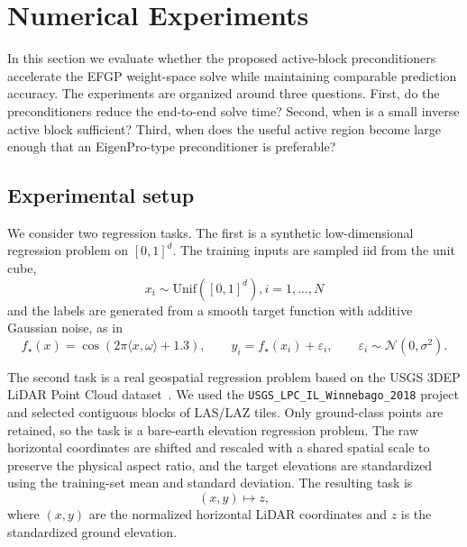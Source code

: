 
\section{Numerical Experiments}
\label{sec:experiments}

In this section we evaluate whether the proposed active-block preconditioners accelerate the EFGP weight-space solve while maintaining comparable prediction accuracy. The experiments are organized around three questions. First, do the preconditioners reduce the end-to-end solve time? Second, when is a small inverse active block sufficient? Third, when does the useful active region become large enough that an EigenPro-type preconditioner is preferable?

\subsection{Experimental setup}
\label{subsec:exp-setup}

We consider two regression tasks. The first is a synthetic low-dimensional regression problem on \([0,1]^d\). The training inputs are sampled iid from the
unit cube,
\[
    x_i\sim \mathrm{Unif}([0,1]^d), i=1,...,N
\]
and the labels are generated from a smooth target function with additive Gaussian noise, as in \cite{greengard2025efgp,barnett2024uniform}
\[
    f_\star(x)
    =
    \cos\!\left(2\pi\langle x,\omega\rangle+1.3\right),
    \qquad
    y_i=f_\star(x_i)+\varepsilon_i,
    \qquad
    \varepsilon_i\sim \mathcal N(0,\sigma^2).
\]

The second task is a real geospatial regression problem based on the USGS 3DEP LiDAR Point Cloud dataset~\cite{usgs3dep_lpc,usgs_winnebago_2018_laz}. We used the
\texttt{USGS\_LPC\_IL\_Winnebago\_2018} project and selected contiguous blocks of LAS/LAZ tiles. Only ground-class points are retained, so the task is a bare-earth elevation regression problem. The raw horizontal coordinates are shifted and rescaled with a shared spatial scale to preserve the physical aspect ratio, and the target elevations are standardized using the training-set mean and standard deviation. The resulting task is
\[
    (x,y)\mapsto z,
\]
where \((x,y)\) are the normalized horizontal LiDAR coordinates and \(z\) is the standardized ground elevation.


